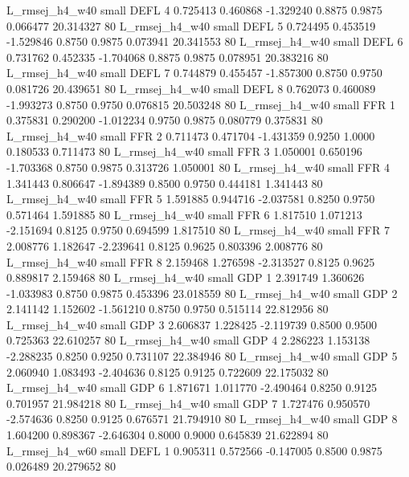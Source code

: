 L_rmsej_h4_w40      small     DEFL                 4 0.725413 0.460868 -1.329240 0.8875 0.9875  0.066477   20.314327 80
L_rmsej_h4_w40      small     DEFL                 5 0.724495 0.453519 -1.529846 0.8750 0.9875  0.073941   20.341553 80
L_rmsej_h4_w40      small     DEFL                 6 0.731762 0.452335 -1.704068 0.8875 0.9875  0.078951   20.383216 80
L_rmsej_h4_w40      small     DEFL                 7 0.744879 0.455457 -1.857300 0.8750 0.9750  0.081726   20.439651 80
L_rmsej_h4_w40      small     DEFL                 8 0.762073 0.460089 -1.993273 0.8750 0.9750  0.076815   20.503248 80
L_rmsej_h4_w40      small      FFR                 1 0.375831 0.290200 -1.012234 0.9750 0.9875  0.080779    0.375831 80
L_rmsej_h4_w40      small      FFR                 2 0.711473 0.471704 -1.431359 0.9250 1.0000  0.180533    0.711473 80
L_rmsej_h4_w40      small      FFR                 3 1.050001 0.650196 -1.703368 0.8750 0.9875  0.313726    1.050001 80
L_rmsej_h4_w40      small      FFR                 4 1.341443 0.806647 -1.894389 0.8500 0.9750  0.444181    1.341443 80
L_rmsej_h4_w40      small      FFR                 5 1.591885 0.944716 -2.037581 0.8250 0.9750  0.571464    1.591885 80
L_rmsej_h4_w40      small      FFR                 6 1.817510 1.071213 -2.151694 0.8125 0.9750  0.694599    1.817510 80
L_rmsej_h4_w40      small      FFR                 7 2.008776 1.182647 -2.239641 0.8125 0.9625  0.803396    2.008776 80
L_rmsej_h4_w40      small      FFR                 8 2.159468 1.276598 -2.313527 0.8125 0.9625  0.889817    2.159468 80
L_rmsej_h4_w40      small      GDP                 1 2.391749 1.360626 -1.033983 0.8750 0.9875  0.453396   23.018559 80
L_rmsej_h4_w40      small      GDP                 2 2.141142 1.152602 -1.561210 0.8750 0.9750  0.515114   22.812956 80
L_rmsej_h4_w40      small      GDP                 3 2.606837 1.228425 -2.119739 0.8500 0.9500  0.725363   22.610257 80
L_rmsej_h4_w40      small      GDP                 4 2.286223 1.153138 -2.288235 0.8250 0.9250  0.731107   22.384946 80
L_rmsej_h4_w40      small      GDP                 5 2.060940 1.083493 -2.404636 0.8125 0.9125  0.722609   22.175032 80
L_rmsej_h4_w40      small      GDP                 6 1.871671 1.011770 -2.490464 0.8250 0.9125  0.701957   21.984218 80
L_rmsej_h4_w40      small      GDP                 7 1.727476 0.950570 -2.574636 0.8250 0.9125  0.676571   21.794910 80
L_rmsej_h4_w40      small      GDP                 8 1.604200 0.898367 -2.646304 0.8000 0.9000  0.645839   21.622894 80
L_rmsej_h4_w60      small     DEFL                 1 0.905311 0.572566 -0.147005 0.8500 0.9875  0.026489   20.279652 80
